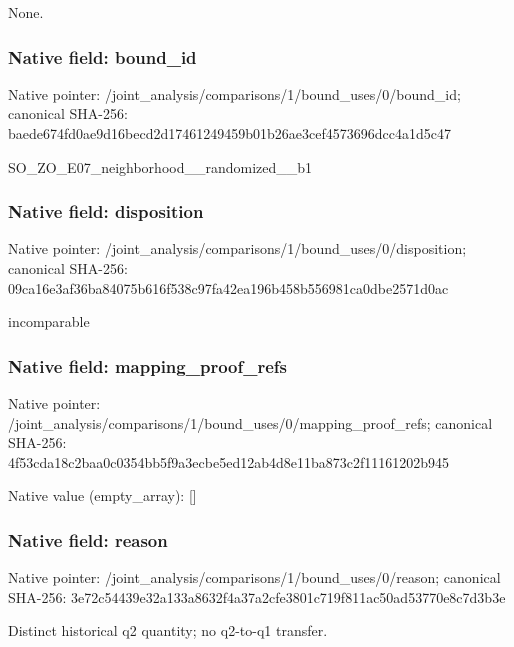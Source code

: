 \documentclass[10pt,a4paper]{article}
\begin{document}
\begingroup\raggedright\sloppy None.\par\endgroup

\subsubsection{Native field: bound\_\allowbreak{}id}
Native pointer: /joint\_\allowbreak{}analysis/comparisons/1/bound\_\allowbreak{}uses/0/bound\_\allowbreak{}id; canonical SHA-256: baede674fd0ae9d16becd2d17461249459b01b26ae3cef4573696dcc4a1d5c47

\begingroup\raggedright\sloppy SO\_\allowbreak{}ZO\_\allowbreak{}E07\_\allowbreak{}neighborhood\_\allowbreak{}\_\allowbreak{}randomized\_\allowbreak{}\_\allowbreak{}b1\par\endgroup

\subsubsection{Native field: disposition}
Native pointer: /joint\_\allowbreak{}analysis/comparisons/1/bound\_\allowbreak{}uses/0/disposition; canonical SHA-256: 09ca16e3af36ba84075b616f538c97fa42ea196b458b556981ca0dbe2571d0ac

\begingroup\raggedright\sloppy incomparable\par\endgroup

\subsubsection{Native field: mapping\_\allowbreak{}proof\_\allowbreak{}refs}
Native pointer: /joint\_\allowbreak{}analysis/comparisons/1/bound\_\allowbreak{}uses/0/mapping\_\allowbreak{}proof\_\allowbreak{}refs; canonical SHA-256: 4f53cda18c2baa0c0354bb5f9a3ecbe5ed12ab4d8e11ba873c2f11161202b945

Native value (empty\_\allowbreak{}array): []

\subsubsection{Native field: reason}
Native pointer: /joint\_\allowbreak{}analysis/comparisons/1/bound\_\allowbreak{}uses/0/reason; canonical SHA-256: 3e72c54439e32a133a8632f4a37a2cfe3801c719f811ac50ad53770e8c7d3b3e

\begingroup\raggedright\sloppy Distinct historical q2 quantity;\allowbreak{} no q2-to-q1 transfer.\par\endgroup
\end{document}
